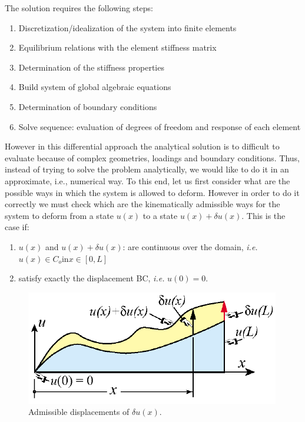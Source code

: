 The solution requires the following steps:
\begin{enumerate}
\item Discretization/idealization of the system into finite elements
\item Equilibrium relations with the element stiffness matrix
\item Determination of the stiffness properties
\item Build system of global algebraic equations
\item Determination of boundary conditions
\item Solve sequence: evaluation of degrees of freedom and response of each element 
\end{enumerate}

However in this differential approach the analytical solution is to difficult to evaluate because of complex geometries, loadings and boundary conditions.
Thus, instead of trying to solve the problem analytically, we would like to do it in an approximate, i.e., numerical way.
To this end, let us first consider what are the possible ways in which the system is allowed to deform. However in order to do it correctly we must check which are the kinematically admissible ways for the system to deform from a state $u(x)$ to a state $u(x)+\delta u(x)$. This is the case if:
\begin{enumerate}
\item $u(x)$ and $u(x)+\delta u(x)$: are continuous over the domain, \textit{i.e.} $u(x)  \in C_o \textrm{in} x \in [0, L]$
\item satisfy exactly the displacement BC, \textit{i.e.} $u(0)=0.$
\end{enumerate}

\begin{figure}[h]
\centering
  \includegraphics[height=5cm]{img/kinematic.png}
   \caption{Admissible displacements of $\delta u(x)$.}
 \label{fgr:graft}
\end{figure}
